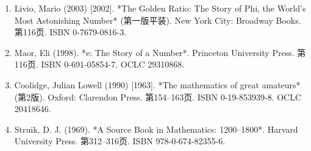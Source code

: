 \begin{enumerate}
\item Livio, Mario (2003) [2002]. *The Golden Ratio: The Story of Phi, the World's Most Astonishing Number* (第一版平装). New York City: Broadway Books. 第116页. ISBN 0-7679-0816-3.  
\item Maor, Eli (1998). *e: The Story of a Number*. Princeton University Press. 第116页. ISBN 0-691-05854-7. OCLC 29310868.  
\item Coolidge, Julian Lowell (1990) [1963]. *The mathematics of great amateurs* (第2版). Oxford: Clarendon Press. 第154–163页. ISBN 0-19-853939-8. OCLC 20418646.  
\item Struik, D. J. (1969). *A Source Book in Mathematics: 1200–1800*. Harvard University Press. 第312–316页. ISBN 978-0-674-82355-6.
\end{enumerate}
